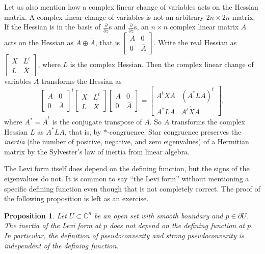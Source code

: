 \documentclass[12pt,openany]{book}
\newcommand{\C}{{\mathbb{C}}}
\newcommand{\myindex}[1]{#1\index{#1}}
\theoremstyle{plain}
\newtheorem{prop}[thm]{Proposition}
\theoremstyle{remark}
\theoremstyle{definition}
\theoremstyle{exercise}
\theoremstyle{example}
\begin{document}
Let us also mention how a complex linear change of variables
acts on the Hessian matrix.  A complex linear change of variables is not an
arbitrary $2n \times 2n$ matrix.  If the Hessian is in the 
basis of $\frac{\partial}{\partial z}$s and
$\frac{\partial}{\partial \bar{z}}$s, an $n \times n$ complex linear matrix $A$
acts on the Hessian as $A \oplus \overline{A}$, that is
$\left[ \begin{smallmatrix} A & 0 \\ 0 & \overline{A} \end{smallmatrix}
\right]$.
Write the real Hessian as
$\left[ \begin{smallmatrix} X & L^t \\ L & \overline{X} \end{smallmatrix}
\right]$, where $L$ is the complex Hessian.  Then the complex linear change
of variables $A$ transforms
the Hessian as
\begin{equation*}
{\begin{bmatrix} A & 0 \\ 0 & \overline{A} \end{bmatrix}}^t
\begin{bmatrix} X & L^t \\ L & \overline{X} \end{bmatrix}
\begin{bmatrix} A & 0 \\ 0 & \overline{A} \end{bmatrix}
=
\begin{bmatrix} A^tXA & {(A^*LA)}^t \\ A^*LA & \overline{A^tXA} \end{bmatrix} ,
\end{equation*}
%
where $A^* = \overline{A}^t$ is the conjugate
transpose of $A$.
So $A$
transforms the complex Hessian $L$ as $A^* L A$, that is, by $*$-congruence.
Star congruence preserves the \emph{\myindex{inertia}}
(the number of positive, negative, and zero eigenvalues)
of a Hermitian matrix
by the Sylvester's law of inertia from linear algebra.

The Levi form itself does depend on the defining function, but the signs of
the eigenvalues do not.  It is common to say ``the
Levi form'' without mentioning a specific defining function
even though that is not completely correct.
The proof of the following proposition is left as an exercise.

\begin{prop} \label{prop:inertiainvariant}
Let $U \subset \C^n$ be an open set with smooth boundary and $p \in \partial
U$.  The inertia  of the Levi form at $p$
does not depend on the defining function at $p$.
In particular, the definition of pseudoconvexity and strong pseudoconvexity is
independent of the defining function.
\end{prop}
\end{document}
